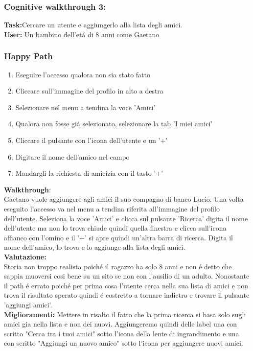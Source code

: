 \documentclass[../Report.tex]{subfiles}
\begin{document}
    \subsubsection{Cognitive walkthrough 3:}
    \textbf{Task:}Cercare un utente e aggiungerlo alla lista degli amici.\\
    \textbf{User:} Un bambino dell'etá di 8 anni come Gaetano
    \subsubsection{Happy Path}
    \begin{enumerate}
        \item Eseguire l'accesso qualora non sia stato fatto 
        \item Cliccare sull'immagine del profilo in alto a destra
        \item Selezionare nel menu a tendina la voce 'Amici'
        \item Qualora non fosse giá selezionato, selezionare la tab 'I miei amici'
        \item Cliccare il pulsante con l'icona dell'utente e un '+'
        \item Digitare il nome dell'amico nel campo
        \item Mandargli la richiesta di amicizia con il tasto '+'
    \end{enumerate}
    \textbf{Walkthrough}:\\
    Gaetano vuole aggiungere agli amici il suo compagno di banco Lucio. Una volta eseguito l'accesso va nel menu a tendina riferita all'immagine del profilo dell'utente.
    Seleziona la voce 'Amici' e clicca sul pulsante 'Ricerca' digita il nome dell'utente ma non lo trova chiude quindi quella finestra e clicca sull'icona affianco con l'omino e il '+' si apre quindi un'altra barra di ricerca.
    Digita il nome dell'amico, lo trova e lo aggiunge alla lista degli amici.\\

    \textbf{Valutazione:}\\Storia non troppo realista poiché il ragazzo ha solo 8 anni e non é detto che sappia muoversi cosi bene su un sito se non con l'ausilio di un adulto.
    Nonostante il path é errato poiché per prima cosa l'utente cerca nella sua lista di amici e non trova il risultato sperato quindi é costretto a tornare indietro e trovare il pulsante 'aggiungi amici'.\\

    \textbf{Miglioramenti:} Mettere in risalto il fatto che la prima ricerca si basa solo sugli amici gia nella lista e non dei nuovi. Aggiungeremo quindi delle label una con scritto "Cerca tra i tuoi amici" sotto l'icona della lente di ingrandimento e una con scritto "Aggiungi un nuovo amico" sotto l'icona per aggiungere nuovi amici. 
\end{document}
